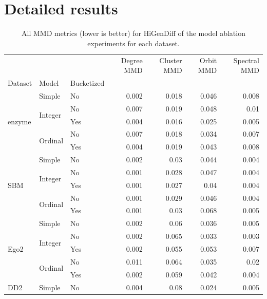 \section{Detailed results}
\label{sec:appendix_higendiff_results}

\begin{table}[H]
    \centering
\caption[All MMD metrics for HiGenDiff.]{All MMD metrics (lower is better) for HiGenDiff of the model ablation experiments for each dataset.}
\label{tab:higendiff_full}
\begin{adjustbox}{width=\textwidth}
    \begin{tabular}{lllrrrr}
\toprule
 &  &  & Degree MMD & Cluster MMD & Orbit MMD & Spectral MMD \\
Dataset & Model & Bucketized &  &  &  &  \\
\midrule
\multirow[t]{5}{*}{enzyme} & Simple & No & 0.002 & 0.018 & 0.046 & 0.008 \\
 & \multirow[t]{2}{*}{Integer} & No & 0.007 & 0.019 & 0.048 & 0.01 \\
 &  & Yes & 0.004 & 0.016 & 0.025 & 0.005 \\
 & \multirow[t]{2}{*}{Ordinal} & No & 0.007 & 0.018 & 0.034 & 0.007 \\
 &  & Yes & 0.004 & 0.019 & 0.043 & 0.008 \\
\midrule
\multirow[t]{5}{*}{SBM} & Simple & No & 0.002 & 0.03 & 0.044 & 0.004 \\
 & \multirow[t]{2}{*}{Integer} & No & 0.001 & 0.028 & 0.047 & 0.004 \\
 &  & Yes & 0.001 & 0.027 & 0.04 & 0.004 \\
 & \multirow[t]{2}{*}{Ordinal} & No & 0.001 & 0.029 & 0.046 & 0.004 \\
 &  & Yes & 0.001 & 0.03 & 0.068 & 0.005 \\
\midrule
\multirow[t]{5}{*}{Ego2} & Simple & No & 0.002 & 0.06 & 0.036 & 0.005 \\
 & \multirow[t]{2}{*}{Integer} & No & 0.002 & 0.065 & 0.033 & 0.003 \\
 &  & Yes & 0.002 & 0.055 & 0.053 & 0.007 \\
 & \multirow[t]{2}{*}{Ordinal} & No & 0.011 & 0.064 & 0.035 & 0.02 \\
 &  & Yes & 0.002 & 0.059 & 0.042 & 0.004 \\
\midrule
\multirow[t]{5}{*}{DD2} & Simple & No & 0.004 & 0.08 & 0.024 & 0.005 \\

\end{tabular}
\end{adjustbox}
\end{table}
